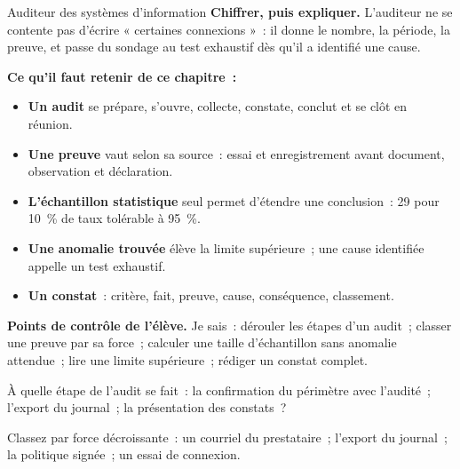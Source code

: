 \begin{boxmetier}{Auditeur des systèmes d'information}
\textbf{Chiffrer, puis expliquer.} L'auditeur ne se contente pas d'écrire
« certaines connexions »~: il donne le nombre, la période, la preuve, et
passe du sondage au test exhaustif dès qu'il a identifié une cause.
\end{boxmetier}

\separateur

\begin{boxresume}
\textbf{Ce qu'il faut retenir de ce chapitre~:}
\begin{itemize}
    \item \textbf{Un audit} se prépare, s'ouvre, collecte, constate,
          conclut et se clôt en réunion.
    \item \textbf{Une preuve} vaut selon sa source~: essai et enregistrement
          avant document, observation et déclaration.
    \item \textbf{L'échantillon statistique} seul permet d'étendre une
          conclusion~: 29 pour 10~\% de taux tolérable à 95~\%.
    \item \textbf{Une anomalie trouvée} élève la limite supérieure~; une
          cause identifiée appelle un test exhaustif.
    \item \textbf{Un constat}~: critère, fait, preuve, cause, conséquence,
          classement.
\end{itemize}
\end{boxresume}

\begin{boxinfo}
\textbf{Points de contrôle de l'élève.} Je sais~: dérouler les étapes d'un
audit~; classer une preuve par sa force~; calculer une taille d'échantillon
sans anomalie attendue~; lire une limite supérieure~; rédiger un constat
complet.
\end{boxinfo}

\bigskip

\begin{boxexo}[title={\ding{45}\quad Exercice~13.1. Les étapes \niveaubase}]
À quelle étape de l'audit se fait~: la confirmation du périmètre avec
l'audité~; l'export du journal~; la présentation des constats~?
\end{boxexo}

\begin{boxexo}[title={\ding{45}\quad Exercice~13.2. Classer les preuves \niveaubase}]
Classez par force décroissante~: un courriel du prestataire~; l'export
du journal~; la politique signée~; un essai de connexion.
\end{boxexo}

